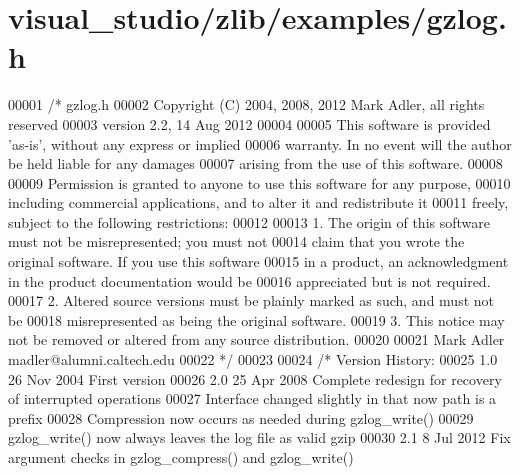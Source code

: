 \hypertarget{visual__studio_2zlib_2examples_2gzlog_8h_source}{}\section{visual\+\_\+studio/zlib/examples/gzlog.h}
\label{visual__studio_2zlib_2examples_2gzlog_8h_source}

\begin{DoxyCode}
00001 \textcolor{comment}{/* gzlog.h}
00002 \textcolor{comment}{  Copyright (C) 2004, 2008, 2012 Mark Adler, all rights reserved}
00003 \textcolor{comment}{  version 2.2, 14 Aug 2012}
00004 \textcolor{comment}{}
00005 \textcolor{comment}{  This software is provided 'as-is', without any express or implied}
00006 \textcolor{comment}{  warranty.  In no event will the author be held liable for any damages}
00007 \textcolor{comment}{  arising from the use of this software.}
00008 \textcolor{comment}{}
00009 \textcolor{comment}{  Permission is granted to anyone to use this software for any purpose,}
00010 \textcolor{comment}{  including commercial applications, and to alter it and redistribute it}
00011 \textcolor{comment}{  freely, subject to the following restrictions:}
00012 \textcolor{comment}{}
00013 \textcolor{comment}{  1. The origin of this software must not be misrepresented; you must not}
00014 \textcolor{comment}{     claim that you wrote the original software. If you use this software}
00015 \textcolor{comment}{     in a product, an acknowledgment in the product documentation would be}
00016 \textcolor{comment}{     appreciated but is not required.}
00017 \textcolor{comment}{  2. Altered source versions must be plainly marked as such, and must not be}
00018 \textcolor{comment}{     misrepresented as being the original software.}
00019 \textcolor{comment}{  3. This notice may not be removed or altered from any source distribution.}
00020 \textcolor{comment}{}
00021 \textcolor{comment}{  Mark Adler    madler@alumni.caltech.edu}
00022 \textcolor{comment}{ */}
00023 
00024 \textcolor{comment}{/* Version History:}
00025 \textcolor{comment}{   1.0  26 Nov 2004  First version}
00026 \textcolor{comment}{   2.0  25 Apr 2008  Complete redesign for recovery of interrupted operations}
00027 \textcolor{comment}{                     Interface changed slightly in that now path is a prefix}
00028 \textcolor{comment}{                     Compression now occurs as needed during gzlog\_write()}
00029 \textcolor{comment}{                     gzlog\_write() now always leaves the log file as valid gzip}
00030 \textcolor{comment}{   2.1   8 Jul 2012  Fix argument checks in gzlog\_compress() and gzlog\_write()}

\end{DoxyCode}
